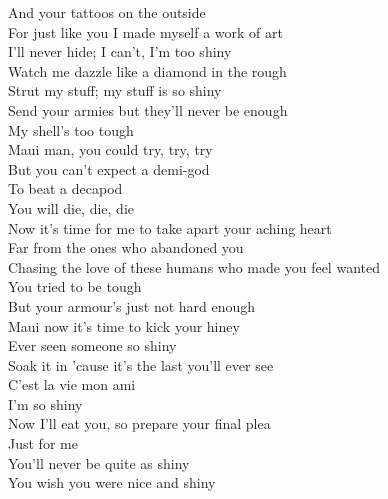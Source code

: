 And your tattoos on the outside\\
For just like you I made myself a work of art\\
I'll never hide; I can't, I'm too shiny\\
Watch me dazzle like a diamond in the rough\\
Strut my stuff; my stuff is so shiny\\
Send your armies but they'll never be enough\\
My shell's too tough\\
Maui man, you could try, try, try\\
But you can't expect a demi-god\\
To beat a decapod \\
You will die, die, die\\
Now it's time for me to take apart your aching heart\\
Far from the ones who abandoned you\\
Chasing the love of these humans who made you feel wanted\\
You tried to be tough\\
But your armour's just not hard enough\\
Maui now it's time to kick your hiney\\
Ever seen someone so shiny\\
Soak it in 'cause it's the last you'll ever see\\
C'est la vie mon ami\\
I'm so shiny\\
Now I'll eat you, so prepare your final plea\\
Just for me\\
You'll never be quite as shiny\\
You wish you were nice and shiny\\

